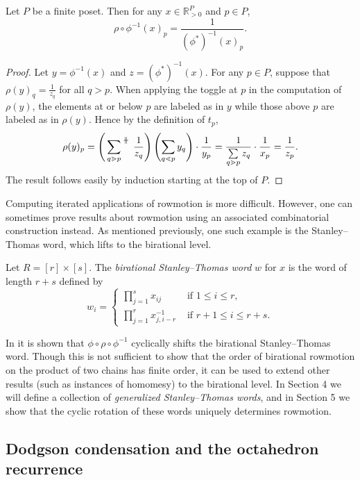 \documentclass[11pt]{article}
\theoremstyle{definition}
\numberwithin{equation}{section}
\numberwithin{equation}{section}
\newcommand{\parallelsum}{\:\ \mathclap{\|}\mathclap{-}\ \:}
\begin{document}
\begin{Lemma} \label{lemma:dualtransfer}
Let $P$ be a finite poset. Then for any $x \in \mathbb{R}_{>0}^{P}$ and $p \in P$,
\[ \rho \circ \phi^{-1}(x)_p = \frac{1}{\left(\phi^*\right)^{-1}(x)_p}.\]
\end{Lemma}
\begin{proof}
Let $y = \phi^{-1}(x)$ and $z = (\phi^*)^{-1}(x)$. For any $p \in P$, suppose that $\rho(y)_q = \frac{1}{z_q}$ for all $q > p$. When applying the toggle at $p$ in the computation of $\rho(y)$, the elements at or below $p$ are labeled as in $y$ while those above $p$ are labeled as in $\rho(y)$. Hence by the definition of $t_p$,
\[
    \rho(y)_p =  \left( \sideset{}{^{\parallelsum}} \sum\limits_{q \gtrdot p} \frac{1}{z_q} \right) \left(\sum\limits_{q \lessdot p} y_q \right) \cdot \frac{1}{y_p}  = \frac{1}{\sum\limits_{q \gtrdot p}z_q} \cdot \frac{1}{x_p} = \frac{1}{z_p}.
\]
The result follows easily by induction starting at the top of $P$.
\end{proof}

Computing iterated applications of rowmotion is more difficult. However, one can sometimes prove results about rowmotion using an associated combinatorial construction instead. As mentioned previously, one such example is the Stanley--Thomas word, which lifts to the birational level.

\begin{Def}
Let $R = [r] \times [s]$. The \emph{birational Stanley--Thomas word} $w$ for $x$ is the word of length $r+s$ defined by
\[w_i = \begin{cases} \prod\limits_{j=1}^s x_{ij} &\text{ if } 1\leq i \leq r, \\ \prod\limits_{j=1}^r x_{j,i-r}^{-1} &\text{ if } r+1\leq i \leq r+s.\end{cases}\]
\end{Def}

In \cite{josephroby1} it is shown that $\phi \circ \rho \circ \phi^{-1}$ cyclically shifts the birational Stanley--Thomas word. Though this is not sufficient to show that the order of birational rowmotion on the product of two chains has finite order, it can be used to extend other results (such as instances of homomesy) to the birational level. In Section 4 we  will define a collection of \emph{generalized Stanley--Thomas words}, and in Section 5 we show that the cyclic rotation of these words uniquely determines rowmotion.

\subsection{Dodgson condensation and the octahedron recurrence} \label{sec:octahedron}
\end{document}
